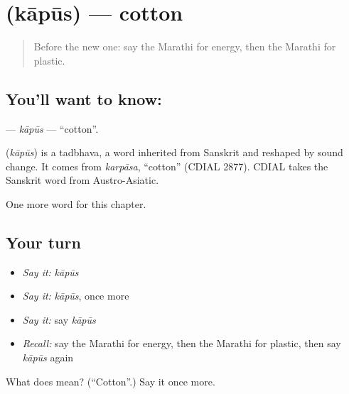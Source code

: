 \section[\texorpdfstring{\mr{कापूस} (kāpūs)}{कापूस (kāpūs)}]{ (kāpūs) — cotton}

\label{lesson:MR-C214-kapus}



\begin{quote}
Before the new one: say the Marathi for energy, then the Marathi for plastic.
\end{quote}

\subsection*{You'll want to know: }
\textbf{} — \emph{kāpūs} — \textquotedblleft{}cotton\textquotedblright{}.

\begin{cousinweb}
\textbf{} (\emph{kāpūs}) is a tadbhava, a word inherited from Sanskrit and reshaped by sound change. It comes from \emph{karpāsa}, \textquotedblleft{}cotton\textquotedblright{} (CDIAL 2877). CDIAL takes the Sanskrit word from Austro-Asiatic.
\end{cousinweb}

\begin{grammarlens}[title={What you've built}]
One more word for this chapter.
\end{grammarlens}

\subsection*{Your turn}
\begin{itemize}
\raggedright
  \item \emph{Say it:} \emph{kāpūs}
  \item \emph{Say it:} \emph{kāpūs}, once more
  \item \emph{Say it:} say \emph{kāpūs}
  \item \emph{Recall:} say the Marathi for energy, then the Marathi for plastic, then say \emph{kāpūs} again
\end{itemize}

\begin{tcolorbox}[breakable,colback=teal!4,colframe=teal!35!black,title={Before you move on}]
What does  mean? (\textquotedblleft{}Cotton\textquotedblright{}.) Say it once more.
\end{tcolorbox}
